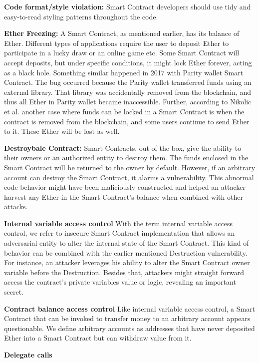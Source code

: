 \documentclass[a4paper,11pt]{article}
\begin{document}
\textbf{Code format/style violation:}
Smart Contract developers should use tidy and easy-to-read styling patterns
throughout the code.

\textbf{Ether Freezing:}
A Smart Contract, as mentioned earlier, has its balance of Ether. Different
types of applications require the user to deposit Ether to participate in a
lucky draw or an online game etc. Some Smart Contract will accept deposits, but
under specific conditions, it might lock Ether forever, acting as a black hole.
Something similar happened in 2017 with Parity wallet Smart Contract. The bug
occurred because the Parity wallet transferred funds using an external library.
That library was accidentally removed from the blockchain, and thus all Ether in
Parity wallet became inaccessible. Further, according to Nikolic et al. another
case where funds can be locked in a Smart Contract is when the contract is
removed from the blockchain, and some users continue to send Ether to it. These
Ether will be lost as well.

\textbf{Destroybale Contract:}
Smart Contracts, out of the box, give the ability to their owners or an
authorized entity to destroy them. The funds enclosed in the Smart Contract will
be returned to the owner by default. However, if an arbitrary account can
destroy the Smart Contract, it alarms a vulnerability. This abnormal code
behavior might have been maliciously constructed and helped an attacker harvest
any Ether in the Smart Contract's balance when combined with other attacks.

\textbf{Internal variable access control}
With the term internal variable access control, we refer to insecure Smart
Contract implementation that allows an adversarial entity to alter the internal
state of the Smart Contract. This kind of behavior can be combined with the
earlier mentioned Destruction vulnerability. For instance, an attacker leverages
his ability to alter the Smart Contract owner variable before the Destruction.
Besides that, attackers might straight forward access the contract's private
variables value or logic, revealing an important secret. 

\textbf{Contract balance access control}
Like internal variable access control, a Smart Contract that can be invoked to
transfer money to an arbitrary account appears questionable. We define arbitrary
accounts as addresses that have never deposited Ether into a Smart Contract but
can withdraw value from it. 

\textbf{Delegate calls}
\end{document}
